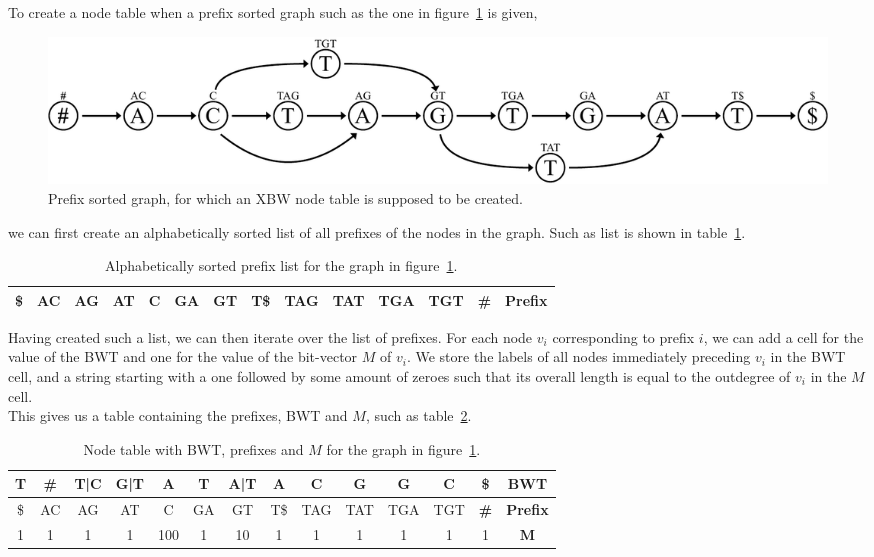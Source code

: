 \documentclass[a4paper,12pt,twoside,BCOR=10mm]{scrbook}
\begin{document}
To create a node table when a prefix sorted graph such as the one in figure~\ref{fig:evo_fig_node_construct_prefixes} is given,
\begin{figure}[!htb]
\centering
\includegraphics[width=\textwidth]{evo_fig_node_construct_prefixes.pdf}
\caption[Prefix sorted graph]{Prefix sorted graph, for which an XBW node table is supposed to be created.} \label{fig:evo_fig_node_construct_prefixes}
\end{figure}
we can first create
an alphabetically sorted list of all prefixes of the nodes in the graph.
Such as list is shown in table~\ref{table:node_construct_prefixes_1}.

\begin{table}[htb]
\centering
\caption[Alphabetically sorted prefix list]{Alphabetically sorted prefix list for the graph in figure~\ref{fig:evo_fig_node_construct_prefixes}.}
\begin{tabular}{ | c | c | c | c | c | c | c | c | c | c | c | c | c | c | }
\hline
\$ & AC & AG & AT & C & GA & GT & T\$ & TAG & TAT & TGA & TGT & \textbf{\#} & \textbf{Prefix} \\ \hline
\end{tabular}
\label{table:node_construct_prefixes_1}
\end{table}

Having created such a list, we can then iterate over the list of prefixes.
For each node $ v_i $ corresponding to prefix $ i $,
we can add a cell for the value of the BWT and one for the value of the bit-vector $ M $ of $ v_i $.
We store the labels of all nodes immediately
preceding $ v_i $ in the BWT cell,
and a string starting with a one followed by some amount of zeroes
such that its overall length is equal to the outdegree of $ v_i $ in the $ M $ cell. \\
This gives us a table containing the prefixes, BWT and $ M $, such as table~\ref{table:node_construct_prefixes_2}.

\begin{table}[htb]
\centering
\caption[Node table with BWT, prefixes and $ M $]{Node table with BWT, prefixes and $ M $ for the graph in figure~\ref{fig:evo_fig_node_construct_prefixes}.}
\begin{tabular}{ | c | c | c | c | c | c | c | c | c | c | c | c | c | c | }
\hline
T & \textbf{\#} & T|C & G|T & A & T & A|T & A & C & G & G & C & \$ & \textbf{BWT} \\ \hline
\$ & AC & AG & AT & C & GA & GT & T\$ & TAG & TAT & TGA & TGT & \textbf{\#} & \textbf{Prefix} \\ \hline
1 & 1 & 1 & 1 & 100 & 1 & 10 & 1 & 1 & 1 & 1 & 1 & 1 & $\boldsymbol{M}$ \\ \hline
\end{tabular}
\label{table:node_construct_prefixes_2}
\end{table}
\end{document}
